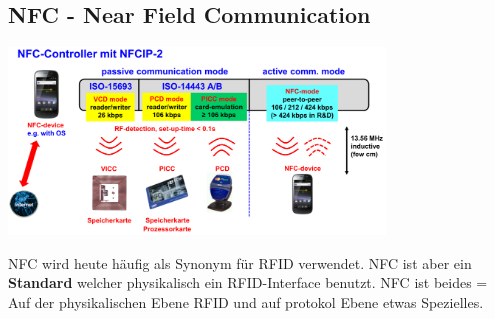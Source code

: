 \subsection{NFC - Near Field Communication}
	
	\begin{minipage}{10cm}
		\includegraphics[width=10cm]{./bilder/rfid-nfc.png} 
	\end{minipage}
			
	NFC wird heute häufig als Synonym für RFID verwendet. NFC ist aber ein \textbf{Standard} welcher physikalisch ein RFID-Interface benutzt. 
	NFC ist beides = Auf der physikalischen Ebene RFID und auf protokol Ebene etwas Spezielles.
	
	
	